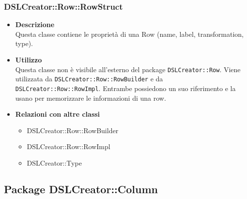  \subsubsection{DSLCreator::Row::RowStruct}
                    \begin{itemize}
                        \item \textbf{Descrizione} \hfill \\
                          Questa classe contiene le proprietà di una Row (name, label, transformation, type).
                        \item \textbf{Utilizzo} \hfill \\
                          Questa classe non è visibile all'esterno del package \texttt{DSLCreator::Row}. Viene utilizzata da \texttt{DSLCreator::Row::RowBuilder} e da \texttt{DSLCreator::Row::RowImpl}. Entrambe possiedono un suo riferimento e la usano per memorizzare le informazioni di una row.
                        \item \textbf{Relazioni con altre classi}
                            \begin{itemize}
                              \item DSLCreator::Row::RowBuilder
                              \item DSLCreator::Row::RowImpl
                              \item DSLCreator::Type
                            \end{itemize}
                    \end{itemize}  

\subsection{Package DSLCreator::Column}

